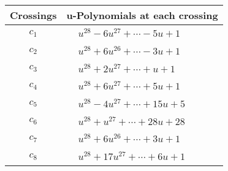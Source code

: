 \documentclass[1p]{elsarticle_modified}
\theoremstyle{definition}
\begin{document}
\begin{tabular}{m{50pt}|m{274pt}}
Crossings & \hspace{64pt}u-Polynomials at each crossing \\
\hline $$\begin{aligned}c_{1}\end{aligned}$$&$\begin{aligned}
&u^{28}-6 u^{27}+\cdots-5 u+1
\end{aligned}$\\
\hline $$\begin{aligned}c_{2}\end{aligned}$$&$\begin{aligned}
&u^{28}+6 u^{26}+\cdots-3 u+1
\end{aligned}$\\
\hline $$\begin{aligned}c_{3}\end{aligned}$$&$\begin{aligned}
&u^{28}+2 u^{27}+\cdots+u+1
\end{aligned}$\\
\hline $$\begin{aligned}c_{4}\end{aligned}$$&$\begin{aligned}
&u^{28}+6 u^{27}+\cdots+5 u+1
\end{aligned}$\\
\hline $$\begin{aligned}c_{5}\end{aligned}$$&$\begin{aligned}
&u^{28}-4 u^{27}+\cdots+15 u+5
\end{aligned}$\\
\hline $$\begin{aligned}c_{6}\end{aligned}$$&$\begin{aligned}
&u^{28}+u^{27}+\cdots+28 u+28
\end{aligned}$\\
\hline $$\begin{aligned}c_{7}\end{aligned}$$&$\begin{aligned}
&u^{28}+6 u^{26}+\cdots+3 u+1
\end{aligned}$\\
\hline $$\begin{aligned}c_{8}\end{aligned}$$&$\begin{aligned}
&u^{28}+17 u^{27}+\cdots+6 u+1
\end{aligned}$\\

\end{tabular}
\end{document}
